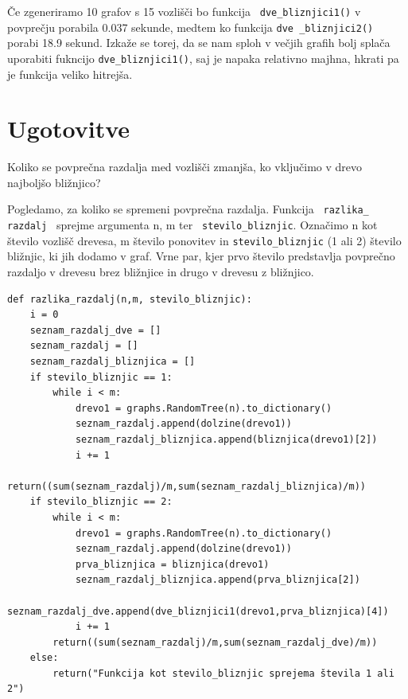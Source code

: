 \documentclass[a4paper,10pt]{article}
\begin{document}
Če zgeneriramo 10 grafov s 15 vozlišči bo funkcija \texttt{ dve\_bliznjici1()} v povprečju porabila 0.037 sekunde, medtem ko funkcija \texttt{dve \_bliznjici2()} porabi 18.9 sekund. Izkaže se torej, da se nam sploh v večjih grafih bolj splača uporabiti fukncijo \texttt{dve\_bliznjici1()}, saj je napaka relativno majhna, hkrati pa je funkcija veliko hitrejša.
\section{Ugotovitve}
 Koliko se povprečna razdalja med vozlišči zmanjša, ko vključimo v drevo najboljšo bližnjico?
\newline

Pogledamo, za koliko se spremeni povprečna razdalja. Funkcija \texttt{ razlika\_ razdalj } sprejme argumenta n, m ter \texttt{ stevilo\_bliznjic}. Označimo n kot število vozlišč drevesa, m število ponovitev in \texttt{stevilo\_bliznjic} (1 ali 2) število bližnjic, ki jih dodamo v graf. Vrne par, kjer prvo število predstavlja povprečno razdaljo v drevesu brez bližnjice in drugo v drevesu z bližnjico. 
\begin{verbatim}
def razlika_razdalj(n,m, stevilo_bliznjic):
    i = 0
    seznam_razdalj_dve = []
    seznam_razdalj = []
    seznam_razdalj_bliznjica = []
    if stevilo_bliznjic == 1:
        while i < m:
            drevo1 = graphs.RandomTree(n).to_dictionary()
            seznam_razdalj.append(dolzine(drevo1))
            seznam_razdalj_bliznjica.append(bliznjica(drevo1)[2])
            i += 1
        return((sum(seznam_razdalj)/m,sum(seznam_razdalj_bliznjica)/m))
    if stevilo_bliznjic == 2:
        while i < m:
            drevo1 = graphs.RandomTree(n).to_dictionary()
            seznam_razdalj.append(dolzine(drevo1))
            prva_bliznjica = bliznjica(drevo1)
            seznam_razdalj_bliznjica.append(prva_bliznjica[2])
            seznam_razdalj_dve.append(dve_bliznjici1(drevo1,prva_bliznjica)[4])
            i += 1
        return((sum(seznam_razdalj)/m,sum(seznam_razdalj_dve)/m))
    else:
        return("Funkcija kot stevilo_bliznjic sprejema števila 1 ali 2")
\end{verbatim}
\end{document}
